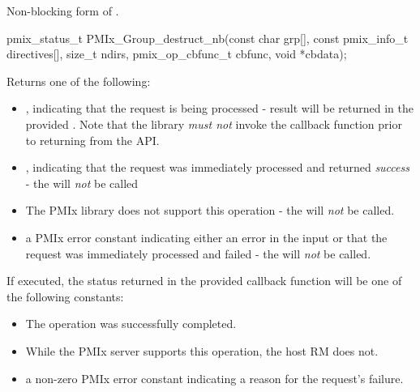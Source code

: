 \summary

Non-blocking form of .

\format

\cspecificstart
\begin{codepar}
pmix_status_t
PMIx_Group_destruct_nb(const char grp[],
                       const pmix_info_t directives[],
                       size_t ndirs,
                       pmix_op_cbfunc_t cbfunc, void *cbdata);
\end{codepar}
\cspecificend

\begin{arglist}
\end{arglist}

Returns one of the following:

\begin{itemize}
    \item {}, indicating that the request is being processed - result will be returned in the provided . Note that the library \emph{must not} invoke the callback function prior to returning from the \ac{API}.
    \item {}, indicating that the request was immediately processed and returned \textit{success} - the  will \textit{not} be called
    \item {} The \ac{PMIx} library does not support this operation - the  will \textit{not} be called.
    \item a \ac{PMIx} error constant indicating either an error in the input or that the request was immediately processed and failed - the  will \textit{not} be called.
\end{itemize}

If executed, the status returned in the provided callback function will be one of the following constants:

\begin{itemize}
\item {} The operation was successfully completed.
\item {} While the \ac{PMIx} server supports this operation, the host \ac{RM} does not.
\item a non-zero \ac{PMIx} error constant indicating a reason for the request's failure.
\end{itemize}

